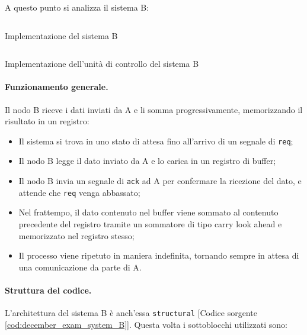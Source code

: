 A questo punto si analizza il sistema B:

\begin{code}
    \inputminted{vhdl}{vhdl/december_exam_system_B.vhd}
    \caption{Implementazione del sistema B}
    \label{cod:december_exam_system_B}
\end{code}

\begin{code}
    \inputminted{vhdl}{vhdl/december_exam_control_unit_B.vhd}
    \caption{Implementazione dell'unità di controllo del sistema B}
    \label{cod:december_exam_control_unit_B}
\end{code}

\paragraph{Funzionamento generale.}
Il nodo B riceve i dati inviati da A e li somma progressivamente, memorizzando il risultato in un registro:

\begin{itemize}
    \item Il sistema si trova in uno stato di attesa fino all'arrivo di un segnale di \texttt{req};
    \item Il nodo B legge il dato inviato da A e lo carica in un registro di buffer;
    \item Il nodo B invia un segnale di \texttt{ack} ad A per confermare la ricezione del dato, e attende che \texttt{req} venga abbassato;
    \item Nel frattempo, il dato contenuto nel buffer viene sommato al contenuto precedente del registro tramite un sommatore di tipo carry look ahead e memorizzato nel registro stesso;
    \item Il processo viene ripetuto in maniera indefinita, tornando sempre in attesa di una comunicazione da parte di A.
\end{itemize}

\paragraph{Struttura del codice.}
L'architettura del sistema B è anch'essa \texttt{structural} [Codice sorgente \ref{cod:december_exam_system_B}]. Questa volta i sottoblocchi utilizzati sono:

